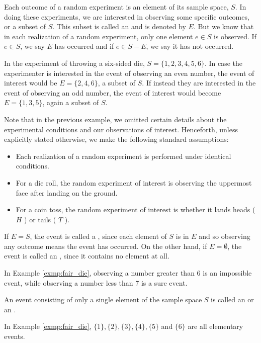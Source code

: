 Each outcome of a random experiment is an element of its sample space, \( S \).
In doing these experiments, we are interested in observing some specific outcomes, or a subset of \( S \).
This subset is called an  and is denoted by \( E \).
But we know that in each realization of a random experiment, only one element \( e \in S \) is observed.
If \( e \in S \), we say \( E \) has occurred and if \( e \in S-E \), we say it has not occurred.
\begin{exmp}\label{exmp:fair_die}
	In the experiment of throwing a six-sided die, \( S = \{ 1, 2, 3, 4, 5, 6 \} \).
	In case the experimenter is interested in the event of observing an even number, the event of interest would be \( E = \{ 2, 4, 6 \} \), a subset of \( S \).
	If instead they are interested in the event of observing an odd number, the event of interest would become \( E = \{ 1, 3, 5 \} \), again a subset of \( S \).
\end{exmp}
Note that in the previous example, we omitted certain details about the experimental conditions and our observations of interest.
Henceforth, unless explicitly stated otherwise, we make the following standard assumptions:
\begin{itemize}
	\item Each realization of a random experiment is performed under identical conditions.
	\item For a die roll, the random experiment of interest is observing the uppermost face after landing on the ground.
	\item For a coin toss, the random experiment of interest is whether it lands heads ( \( H \) ) or tails ( \( T \) ).
\end{itemize}
If \( E = S \), the event is called a , since each element of \( S \) is in \( E \) and so observing any outcome means the event has occurred.
On the other hand, if \( E = \emptyset \), the event is called an , since it contains no element at all.
\begin{exmp}
	In Example \autoref{exmp:fair_die}, observing a number greater than 6 is an impossible event, while observing a number less than 7 is a sure event.
\end{exmp}
An event consisting of only a single element of the sample space \( S \) is called an  or an .
\begin{exmp}
	In Example \autoref{exmp:fair_die}, \( \{ 1 \}, \{ 2 \}, \{ 3 \}, \{ 4 \}, \{ 5 \} \) and \( \{ 6 \} \) are all elementary events.
\end{exmp}
